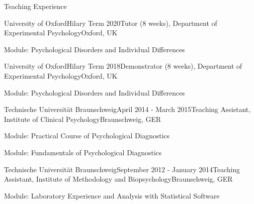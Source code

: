 \documentclass{resume} %
\begin{document}


\begin{rSection}{Teaching Experience}

\begin{rSubsection}{University of Oxford}{Hilary Term 2020}{Tutor (8 weeks), Department of Experimental Psychology}{Oxford, UK}
\item Module: Psychological Disorders and Individual Differences
\end{rSubsection}

\begin{rSubsection}{University of Oxford}{Hilary Term 2018}{Demonstrator (8 weeks), Department of Experimental Psychology}{Oxford, UK}
\item Module: Psychological Disorders and Individual Differences
\end{rSubsection}

\begin{rSubsection}{Technische Universit{\"a}t Braunschweig}{April 2014 - March 2015}{Teaching Assistant, Institute of Clinical Psychology}{Braunschweig, GER}
\item Module: Practical Course of Psychological Diagnostics
\item Module: Fundamentals of Psychological Diagnostics
\end{rSubsection}

\begin{rSubsection}{Technische Universit{\"a}t Braunschweig}{September 2012 - January 2014}{Teaching Assistant, Institute of Methodology and Biopsychology}{Braunschweig, GER}
\item Module: Laboratory Experience and Analysis with Statistical Software
\end{rSubsection}

\end{rSection}

\end{document}
